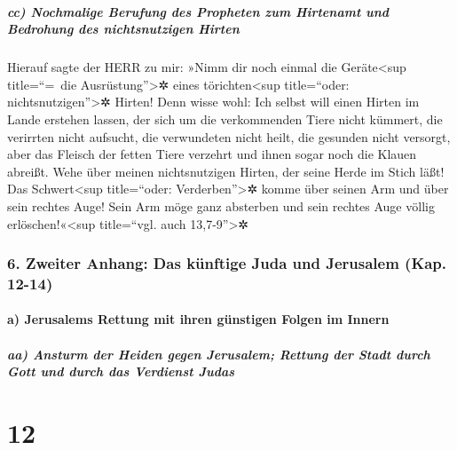 \hypertarget{cc-nochmalige-berufung-des-propheten-zum-hirtenamt-und-bedrohung-des-nichtsnutzigen-hirten}{%
\subparagraph{cc) Nochmalige Berufung des Propheten zum Hirtenamt und
Bedrohung des nichtsnutzigen
Hirten}\label{cc-nochmalige-berufung-des-propheten-zum-hirtenamt-und-bedrohung-des-nichtsnutzigen-hirten}}

 Hierauf sagte der HERR zu mir: »Nimm dir noch einmal die
Geräte\textless sup title=``=~die Ausrüstung''\textgreater✲ eines
törichten\textless sup title=``oder: nichtsnutzigen''\textgreater✲
Hirten!  Denn wisse wohl: Ich selbst will einen Hirten im
Lande erstehen lassen, der sich um die verkommenden Tiere nicht kümmert,
die verirrten nicht aufsucht, die verwundeten nicht heilt, die gesunden
nicht versorgt, aber das Fleisch der fetten Tiere verzehrt und ihnen
sogar noch die Klauen abreißt.  Wehe über meinen
nichtsnutzigen Hirten, der seine Herde im Stich läßt! Das
Schwert\textless sup title=``oder: Verderben''\textgreater✲ komme über
seinen Arm und über sein rechtes Auge! Sein Arm möge ganz absterben und
sein rechtes Auge völlig erlöschen!«\textless sup title=``vgl. auch
13,7-9''\textgreater✲

\hypertarget{zweiter-anhang-das-kuxfcnftige-juda-und-jerusalem-kap.-12-14}{%
\subsubsection{6. Zweiter Anhang: Das künftige Juda und Jerusalem (Kap.
12-14)}\label{zweiter-anhang-das-kuxfcnftige-juda-und-jerusalem-kap.-12-14}}

\hypertarget{a-jerusalems-rettung-mit-ihren-guxfcnstigen-folgen-im-innern}{%
\paragraph{a) Jerusalems Rettung mit ihren günstigen Folgen im
Innern}\label{a-jerusalems-rettung-mit-ihren-guxfcnstigen-folgen-im-innern}}

\hypertarget{aa-ansturm-der-heiden-gegen-jerusalem-rettung-der-stadt-durch-gott-und-durch-das-verdienst-judas}{%
\subparagraph{aa) Ansturm der Heiden gegen Jerusalem; Rettung der Stadt
durch Gott und durch das Verdienst
Judas}\label{aa-ansturm-der-heiden-gegen-jerusalem-rettung-der-stadt-durch-gott-und-durch-das-verdienst-judas}}

\hypertarget{section-11}{%
\section{12}\label{section-11}}

